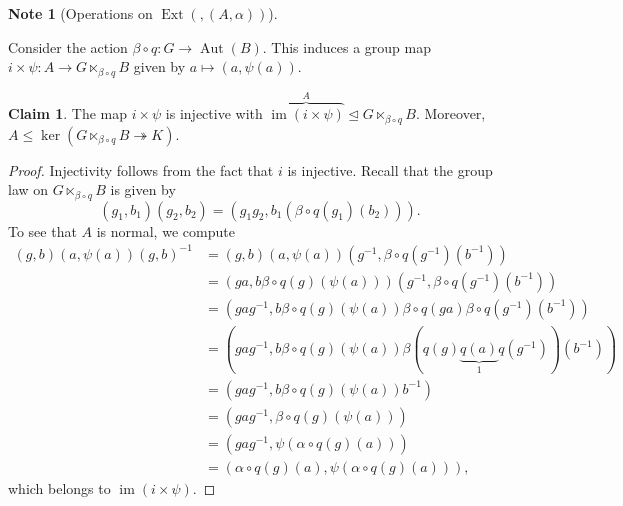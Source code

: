\documentclass[10pt,letterpaper,cm]{nupset}
\theoremstyle{definition}
\newtheorem{note}[definition]{Note}
\theoremstyle{theorem}
\newtheorem*{claim}{Claim}
\theoremstyle{remark}
\newcommand{\1}{\mathbf{1}}
\newcommand{\0}{\vec 0}
\DeclareMathOperator{\aut}{Aut}
\DeclareMathOperator{\ext}{Ext}
\DeclareMathOperator{\im}{im}
\begin{document}
\begin{note}[Operations on $\ext(, (A, \alpha))$]
\begin{enumerate}[label=(\arabic*)]
Consider the action $\beta \circ q : G \to \aut(B)$. This induces a group map $i \times \psi : A \to G \ltimes_{\beta \circ q} B$ given by $a \mapsto \left(a, \psi(a)\right)$.
\begin{claim}
The map $i \times \psi$ is injective with $\overbrace{\im(i \times \psi)}^{A} \unlhd G \ltimes_{\beta \circ q} B$. Moreover, $A \leq \ker(G\ltimes_{\beta \circ q} B \twoheadrightarrow K)$.
\end{claim}
\begin{proof}
Injectivity follows from the fact that $i$ is injective. Recall that the group law on $G \ltimes_{\beta \circ q} B$ is given by $$(g_1, b_1)(g_2, b_2) = \left(g_1g_2, b_1(\beta \circ q(g_1)(b_2))\right).$$ To see that $A$ is normal, we compute
\begin{align*}
(g, b)(a, \psi(a))(g,b)^{-1} & = (g, b)(a, \psi(a) )(g^{-1}, \beta \circ q(g^{-1})(b^{-1})) 
\\ & = (ga, b\beta \circ q(g)(\psi(a)))(g^{-1}, \beta \circ q(g^{-1})(b^{-1}))
\\ &  = \left(gag^{-1}, b\beta \circ q(g)(\psi(a))\beta \circ q(ga)\beta \circ q(g^{-1})(b^{-1})\right)
\\ &  = \left(gag^{-1}, b\beta \circ q(g)(\psi(a)) \beta (q(g)\underbrace{q(a)}_{1}q(g^{-1}))(b^{-1})\right)
\\ & =  \left(gag^{-1}, b\beta \circ q(g)(\psi(a))b^{-1}\right) 
\\ & = \left(gag^{-1}, \beta \circ q(g)(\psi(a))\right)
\\ &  = \left(gag^{-1}, \psi(\alpha \circ q(g)(a))\right)
\\ &  = \left(\alpha \circ q(g)(a),  \psi(\alpha \circ q(g)(a))\right),
 \end{align*} 
which belongs to $\im(i \times \psi)$.


\end{proof}
\end{enumerate}
\end{note}
\end{document}
